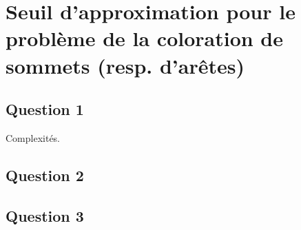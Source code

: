 \section{Seuil d'approximation pour le problème de la coloration de sommets (resp.
d'arêtes)}\label{ex11}

\subsection{Question 1}\label{ex11_q1}
Complexités.

\subsection{Question 2}\label{ex11_q2}

\subsection{Question 3}\label{ex11_q3}
